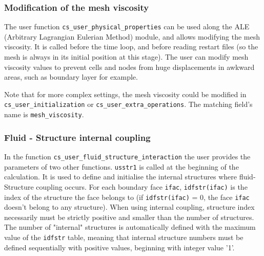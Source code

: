 \subsubsection{Modification of the mesh viscosity}

The user function \texttt{cs\_user\_physical\_properties} can be used along the ALE (Arbitrary Lagrangian Eulerian
 Method) module, and allows modifying the mesh viscosity.
 It is called before the time loop, and before reading restart files
 (so the mesh is always in its initial position at this stage).
The user can modify mesh viscosity values to prevent cells and nodes from huge
 displacements in awkward areas, such as boundary layer for example.

Note that for more complex settings, the mesh viscosity could be modified in
 \texttt{cs\_user\_initialization} or \texttt{cs\_user\_extra\_operations}.
 The matching field's name is \texttt{mesh\_viscosity}.

\subsubsection{Fluid - Structure internal coupling}\label{sec:ALE}

In the function \texttt{cs\_user\_fluid\_structure\_interaction} the user provides the parameters of two other functions.
\texttt{usstr1} is called at the beginning of the calculation. It is used to define
 and initialise the internal structures where fluid-Structure coupling occurs.
For each boundary face \texttt{ifac}, \texttt{idfstr(ifac)} is the index of the structure
 the face belongs to (if \texttt{idfstr(ifac)} = 0, the face \texttt{ifac} doesn't belong
 to any structure). When using internal coupling, structure index necessarily must be
 strictly positive and smaller than the number of structures. The number of "internal" structures is automatically defined with the maximum
 value of the \texttt{idfstr} table, meaning that internal structure numbers must be defined
 sequentially with positive values, beginning with integer value '1'.

